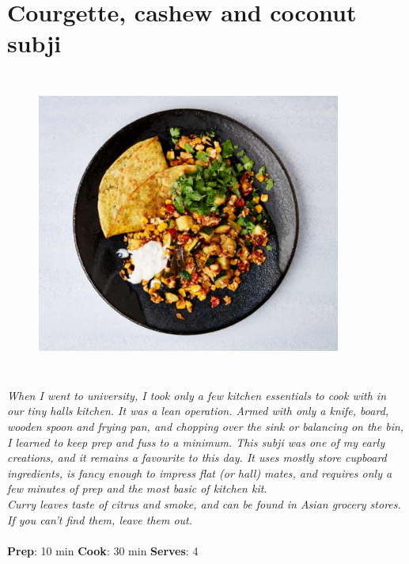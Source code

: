\documentclass{book}
\begin{document}
\section{Courgette, cashew and coconut subji}
\begin{figure}
\centering\includegraphics[width=10cm,height=10cm,keepaspectratio]{Recipe_Pictures/Courgette,_cashew_and_coconut_subji.png}
\end{figure}
\emph{When I went to university, I took only a few kitchen essentials to cook with in our tiny halls kitchen. It was a lean operation. Armed with only a knife, board, wooden spoon and frying pan, and chopping over the sink or balancing on the bin, I learned to keep prep and fuss to a minimum. This subji was one of my early creations, and it remains a favourite to this day. It uses mostly store cupboard ingredients, is fancy enough to impress flat (or hall) mates, and requires only a few minutes of prep and the most basic of kitchen kit.\\ 
Curry leaves taste of citrus and smoke, and can be found in Asian grocery stores. If you can’t find them, leave them out.}\\\\ 
\textbf{Prep}: 10 min
\textbf{Cook}: 30 min
\textbf{Serves}: 4
\end{document}
